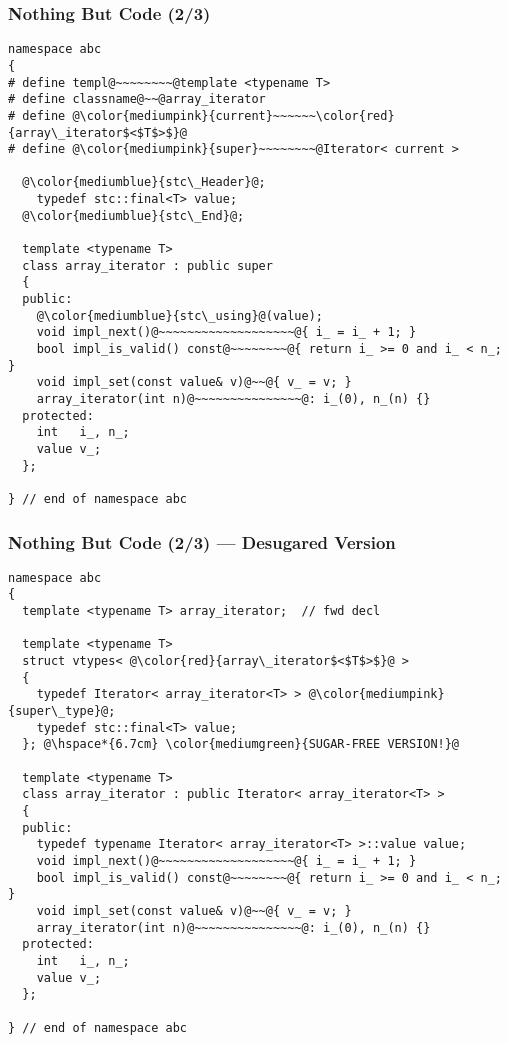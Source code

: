 \begin{frame}[fragile]
  \frametitle{Nothing But Code (2/3)}

%
\begin{lstlisting}[escapechar=@,basicstyle={\tiny\sffamily}]
namespace abc
{
# define templ@~~~~~~~~@template <typename T>
# define classname@~~@array_iterator
# define @\color{mediumpink}{current}~~~~~~\color{red}{array\_iterator$<$T$>$}@
# define @\color{mediumpink}{super}~~~~~~~~@Iterator< current >

  @\color{mediumblue}{stc\_Header}@;
    typedef stc::final<T> value;
  @\color{mediumblue}{stc\_End}@;

  template <typename T>
  class array_iterator : public super
  {
  public:
    @\color{mediumblue}{stc\_using}@(value);
    void impl_next()@~~~~~~~~~~~~~~~~~~~@{ i_ = i_ + 1; }
    bool impl_is_valid() const@~~~~~~~~@{ return i_ >= 0 and i_ < n_; }
    void impl_set(const value& v)@~~@{ v_ = v; }
    array_iterator(int n)@~~~~~~~~~~~~~~~@: i_(0), n_(n) {}
  protected:
    int   i_, n_;
    value v_;
  };

} // end of namespace abc
\end{lstlisting}
%

\end{frame}



\begin{frame}[fragile]
  \frametitle{Nothing But Code (2/3) --- Desugared Version}

%
\begin{lstlisting}[escapechar=@,basicstyle={\tiny\sffamily}]
namespace abc
{
  template <typename T> array_iterator;  // fwd decl

  template <typename T>
  struct vtypes< @\color{red}{array\_iterator$<$T$>$}@ >
  {
    typedef Iterator< array_iterator<T> > @\color{mediumpink}{super\_type}@;
    typedef stc::final<T> value;
  }; @\hspace*{6.7cm} \color{mediumgreen}{SUGAR-FREE VERSION!}@
  
  template <typename T>
  class array_iterator : public Iterator< array_iterator<T> >
  {
  public:
    typedef typename Iterator< array_iterator<T> >::value value;
    void impl_next()@~~~~~~~~~~~~~~~~~~~@{ i_ = i_ + 1; }
    bool impl_is_valid() const@~~~~~~~~@{ return i_ >= 0 and i_ < n_; }
    void impl_set(const value& v)@~~@{ v_ = v; }
    array_iterator(int n)@~~~~~~~~~~~~~~~@: i_(0), n_(n) {}
  protected:
    int   i_, n_;
    value v_;
  };

} // end of namespace abc
\end{lstlisting}
%

\end{frame}


